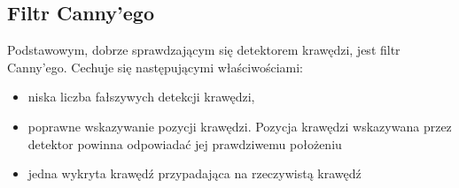 \subsection{Filtr Canny'ego}
Podstawowym, dobrze sprawdzającym się detektorem krawędzi, jest filtr Canny'ego. 
Cechuje się następującymi właściwościami: %

\begin{itemize}
\item niska liczba fałszywych detekcji krawędzi,
\item poprawne wskazywanie pozycji krawędzi. Pozycja krawędzi wskazywana przez detektor powinna odpowiadać jej prawdziwemu położeniu
\item jedna wykryta krawędź przypadająca na rzeczywistą krawędź
\end{itemize}

